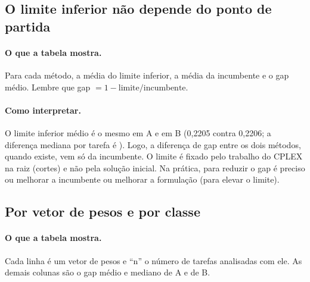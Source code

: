 \documentclass[11pt,a4paper]{article}
\begin{document}
\subsection{O limite inferior não depende do ponto de partida}

\begin{table}[H]
  \centering
  \small
  
  \caption{Limite inferior, incumbente e gap médios. O limite de A é derivado do gap
  reportado (incumbente $\times(1-\text{gap})$).}
  \label{tab:bound}
\end{table}

\paragraph{O que a tabela mostra.} Para cada método, a média do limite inferior, a
média da incumbente e o gap médio. Lembre que gap $=1-\text{limite}/\text{incumbente}$.

\paragraph{Como interpretar.} O limite inferior médio é o mesmo em A e em B (0,2205 contra
0,2206; a diferença mediana por tarefa é \boundDiffMedian{}). Logo, a diferença de gap
entre os dois métodos, quando existe, vem só da incumbente. O limite é fixado pelo
trabalho do CPLEX na raiz (cortes) e não pela solução inicial. Na prática, para reduzir o
gap é preciso ou melhorar a incumbente ou melhorar a formulação (para elevar o limite).

\subsection{Por vetor de pesos e por classe}

\begin{table}[H]
  \centering
  \scriptsize
  \resizebox{\textwidth}{!}{}
  \caption{Gap por vetor de pesos, nas tarefas analisadas.}
  \label{tab:gap-peso}
\end{table}

\paragraph{O que a tabela mostra.} Cada linha é um vetor de pesos e ``n'' o número de
tarefas analisadas com ele. As demais colunas são o gap médio e mediano de A e de B.
\end{document}
